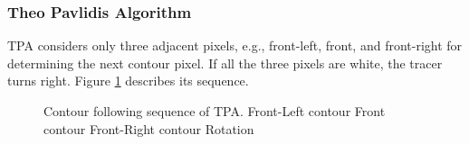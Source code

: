 \subsubsection{Theo Pavlidis Algorithm}
TPA \cite{Pavlidis2012Algorithms} considers only three adjacent pixels, e.g., front-left, front, and front-right for determining the next contour pixel. If all the three pixels are white, the tracer turns right. Figure \ref{fig:tpa} describes its sequence. 

\begin{figure}[htbp]
	\centering
	 
	\caption{Contour following sequence of TPA\cite{Cheong2006Advanced}. \protect{} Front-Left contour \protect{} Front contour \protect{} Front-Right contour \protect{} Rotation}
	\label{fig:tpa}
\end{figure}

